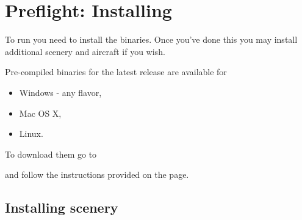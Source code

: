 
\chapter{Preflight: Installing \FlightGear{}}
\label{prefligh}

To run \FlightGear{} you need to install the binaries. Once you've done this you may install additional scenery and aircraft if you wish.

Pre-compiled binaries for the latest release are available for

\begin{itemize}
\item Windows - any flavor,
\item Mac OS X,
\item Linux.
\end{itemize}

To download them go to

\medskip
{}
\medskip

and follow the instructions provided on the page.

\section{Installing scenery}

